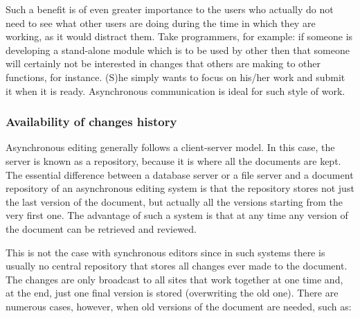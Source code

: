 Such a benefit is of even greater importance to the users who actually do not need to see what other
users are doing during the time in which they are working, as it would distract them. Take
programmers, for example: if someone is developing a stand-alone module which is to be used by
other then that someone will certainly not be interested in changes that others are making to
other functions, for instance. (S)he simply wants to focus on his/her work and submit it when it
is ready. Asynchronous communication is ideal for such style of work.

\subsubsection{Availability of changes history}

Asynchronous editing generally follows a client-server model. In this case, the server is known as
a repository, because it is where all the documents are kept. The essential difference between a
database server or a file server and a document repository of an asynchronous editing system is that
the repository stores not just the last version of the document, but actually all the versions
starting from the very first one. The advantage of such a system is that at any time any version
of the document can be retrieved and reviewed.

This is not the case with synchronous editors since in such systems there is usually no central
repository that stores all changes ever made to the document. The changes are only broadcast to
all sites that work together at one time and, at the end, just one final version is stored
(overwriting the old one). There are numerous cases, however, when old versions of the document
are needed, such as:

